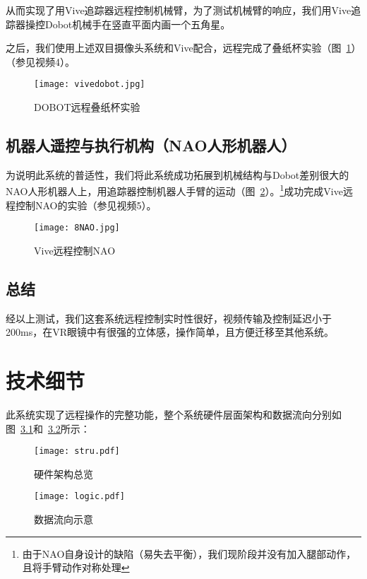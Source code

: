 从而实现了用Vive追踪器远程控制机械臂，为了测试机械臂的响应，我们用Vive追踪器操控Dobot机械手在竖直平面内画一个五角星。

之后，我们使用上述双目摄像头系统和Vive配合，远程完成了叠纸杯实验（图~\ref{cup}）{\kaishu （参见视频4）}。

\begin{figure}[htbp]
\small
\centering
\texttt{[image: vivedobot.jpg]}
\caption{DOBOT远程叠纸杯实验} 
\label{cup}
\end{figure}


\section{机器人遥控与执行机构（NAO人形机器人）}

为说明此系统的普适性，我们将此系统成功拓展到机械结构与Dobot差别很大的NAO人形机器人上，用追踪器控制机器人手臂的运动（图~\ref{8NAO}）。\footnote{由于NAO自身设计的缺陷（易失去平衡），我们现阶段并没有加入腿部动作，且将手臂动作对称处理}成功完成Vive远程控制NAO的实验{\kaishu （参见视频5）}。

\begin{figure}[htbp]
\small
\centering
\texttt{[image: 8NAO.jpg]}
\caption{Vive远程控制NAO} 
\label{8NAO}
\end{figure}


\section{总结}

经以上测试，我们这套系统远程控制实时性很好，视频传输及控制延迟小于200ms，在VR眼镜中有很强的立体感，操作简单，且方便迁移至其他系统。



\chapter{技术细节}

此系统实现了远程操作的完整功能，整个系统硬件层面架构和数据流向分别如图~\ref{stru}和~\ref{logic}所示：

\begin{figure}[htbp]
\small
\centering
\texttt{[image: stru.pdf]}
\caption{硬件架构总览} 
\label{stru}
\end{figure}

\begin{figure}[htbp]
\small
\centering
\texttt{[image: logic.pdf]}
\caption{数据流向示意} 
\label{logic}
\end{figure}

